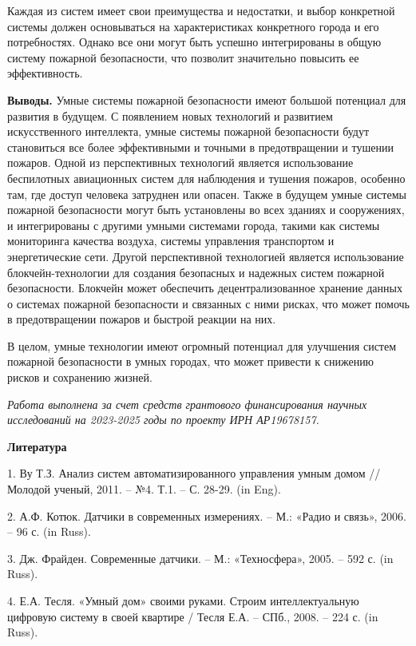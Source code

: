\begin{multicols}{2}

Каждая из систем имеет свои преимущества и недостатки, и выбор
конкретной системы должен основываться на характеристиках конкретного
города и его потребностях. Однако все они могут быть успешно
интегрированы в общую систему пожарной безопасности, что позволит
значительно повысить ее эффективность.

{\bfseries Выводы.} Умные системы пожарной безопасности имеют большой
потенциал для развития в будущем. С появлением новых технологий и
развитием искусственного интеллекта, умные системы пожарной безопасности
будут становиться все более эффективными и точными в предотвращении и
тушении пожаров. Одной из перспективных технологий является
использование беспилотных авиационных систем для наблюдения и тушения
пожаров, особенно там, где доступ человека затруднен или опасен. Также в
будущем умные системы пожарной безопасности могут быть установлены во
всех зданиях и сооружениях, и интегрированы с другими умными системами
города, такими как системы мониторинга качества воздуха, системы
управления транспортом и энергетические сети. Другой перспективной
технологией является использование блокчейн-технологии для создания
безопасных и надежных систем пожарной безопасности. Блокчейн может
обеспечить децентрализованное хранение данных о системах пожарной
безопасности и связанных с ними рисках, что может помочь в
предотвращении пожаров и быстрой реакции на них.

В целом, умные технологии имеют огромный потенциал для улучшения систем
пожарной безопасности в умных городах, что может привести к снижению
рисков и сохранению жизней.
\end{multicols}

\emph{Работа выполнена за счет средств грантового финансирования научных
исследований на 2023-2025 годы по проекту ИРН АР19678157.}

{\bfseries Литература}

1. Ву Т.З. Анализ систем автоматизированного управления умным домом //
Молодой ученый, 2011. -- №4. Т.1. -- С. 28-29. (in Eng).

2. А.Ф. Котюк. Датчики в современных измерениях. -- М.: «Радио и связь»,
2006. -- 96 с. (in Russ).

3. Дж. Фрайден. Современные датчики. -- М.: «Техносфера», 2005. -- 592
с. (in Russ).

4. Е.А. Тесля. «Умный дом» своими руками. Строим интеллектуальную
цифровую систему в своей квартире / Тесля Е.А. -- СПб., 2008. -- 224 с.
(in Russ).

